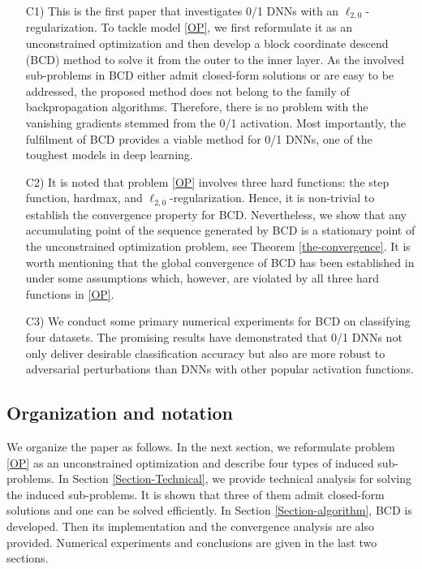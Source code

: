 \documentclass[journal]{IEEEtran}
\begin{document}
\begin{itemize}[leftmargin=20pt]
\item[C1)] This is the first paper that investigates  0/1  DNNs with an $\ell_{2,0}$-regularization. To tackle model \eqref{OP}, we first reformulate it as an unconstrained optimization and then develop a block coordinate descend (BCD) method  to solve it from the outer to the inner layer. As the involved sub-problems in BCD either admit closed-form solutions or are easy to be addressed, the proposed method does not belong to the family of backpropagation algorithms. Therefore, there is no problem with the vanishing gradients stemmed from the 0/1 activation. Most importantly, the fulfilment of BCD provides a viable method for 0/1 DNNs, one of the toughest models in deep learning.

\item[C2)] It is noted that problem \eqref{OP} involves three hard functions: the step function, hardmax, and $\ell_{2,0}$-regularization. Hence, it is non-trivial to establish the convergence property for BCD. Nevertheless, we show that any accumulating point of the sequence generated by BCD is a stationary point of the unconstrained optimization problem, see Theorem \ref{the-convergence}. It is worth mentioning that the global convergence of BCD has been established in \cite{Zhang2017, Lau2018, Zeng2019} under some assumptions which, however, are violated by all three hard functions in  \eqref{OP}.

\item[C3)] We conduct some primary numerical experiments for BCD on classifying four datasets. The promising results have demonstrated that 0/1 DNNs not only deliver desirable classification accuracy but also are more robust to adversarial perturbations \cite{Zheng2018} than DNNs with other popular activation functions.
\end{itemize}

\subsection{Organization and notation}
We organize the paper as follows. In the next section, we reformulate problem \eqref{OP} as an unconstrained optimization and describe four types of induced sub-problems. In Section \ref{Section-Technical}, we provide technical analysis for solving the induced sub-problems. It is shown that three of them admit closed-form solutions and one can be solved efficiently. In Section \ref{Section-algorithm}, BCD is developed. Then its implementation and the convergence analysis are also provided. Numerical experiments and conclusions are given in the last two sections.
\end{document}
